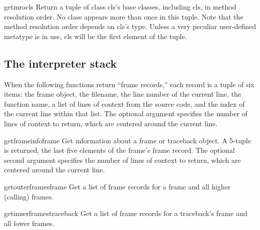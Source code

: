 \begin{funcdesc}{getmro}{cls}
  Return a tuple of class cls's base classes, including cls, in
  method resolution order.  No class appears more than once in this tuple.
  Note that the method resolution order depends on cls's type.  Unless a
  very peculiar user-defined metatype is in use, cls will be the first
  element of the tuple.
\end{funcdesc}

\subsection{The interpreter stack
            \label{inspect-stack}}

When the following functions return ``frame records,'' each record
is a tuple of six items: the frame object, the filename,
the line number of the current line, the function name, a list of
lines of context from the source code, and the index of the current
line within that list.
The optional  argument specifies the number of lines of
context to return, which are centered around the current line.


\begin{funcdesc}{getframeinfo}{frame}
  Get information about a frame or traceback object.  A 5-tuple
  is returned, the last five elements of the frame's frame record.
  The optional second argument specifies the number of lines of context
  to return, which are centered around the current line.
\end{funcdesc}

\begin{funcdesc}{getouterframes}{frame}
  Get a list of frame records for a frame and all higher (calling)
  frames.
\end{funcdesc}

\begin{funcdesc}{getinnerframes}{traceback}
  Get a list of frame records for a traceback's frame and all lower
  frames.
\end{funcdesc}

